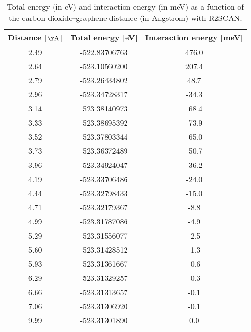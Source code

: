 \begin{table}[h]
\centering
\begin{tabular}{ccc}
\hline
Distance [$\mathrm{\AA}$] & Total energy [eV] & Interaction energy [meV] \\
\hline
2.49 & -522.83706763 & 476.0 \\
2.64 & -523.10560200 & 207.4 \\
2.79 & -523.26434802 & 48.7 \\
2.96 & -523.34728317 & -34.3 \\
3.14 & -523.38140973 & -68.4 \\
3.33 & -523.38695392 & -73.9 \\
3.52 & -523.37803344 & -65.0 \\
3.73 & -523.36372489 & -50.7 \\
3.96 & -523.34924047 & -36.2 \\
4.19 & -523.33706486 & -24.0 \\
4.44 & -523.32798433 & -15.0 \\
4.71 & -523.32179367 & -8.8 \\
4.99 & -523.31787086 & -4.9 \\
5.29 & -523.31556077 & -2.5 \\
5.60 & -523.31428512 & -1.3 \\
5.93 & -523.31361667 & -0.6 \\
6.29 & -523.31329257 & -0.3 \\
6.66 & -523.31313657 & -0.1 \\
7.06 & -523.31306920 & -0.1 \\
9.99 & -523.31301890 & 0.0 \\
\hline
\end{tabular}
\caption{Total energy (in eV) and interaction energy (in meV) as a function of the carbon dioxide--graphene distance (in Angstrom) with R2SCAN.}
\label{SI_dft_table_R2SCAN}
\end{table}